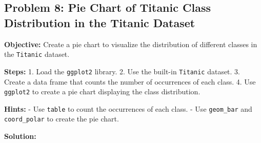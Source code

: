\documentclass[
  letterpaper,
  DIV=11,
  numbers=noendperiod]{scrreprt}
\newenvironment{Shaded}{\begin{snugshade}}{\end{snugshade}}
\newcommand{\AttributeTok}[1]{\textcolor[rgb]{0.40,0.45,0.13}{#1}}
\newcommand{\CommentTok}[1]{\textcolor[rgb]{0.37,0.37,0.37}{#1}}
\newcommand{\DecValTok}[1]{\textcolor[rgb]{0.68,0.00,0.00}{#1}}
\newcommand{\FunctionTok}[1]{\textcolor[rgb]{0.28,0.35,0.67}{#1}}
\newcommand{\NormalTok}[1]{\textcolor[rgb]{0.00,0.23,0.31}{#1}}
\newcommand{\OtherTok}[1]{\textcolor[rgb]{0.00,0.23,0.31}{#1}}
\newcommand{\SpecialCharTok}[1]{\textcolor[rgb]{0.37,0.37,0.37}{#1}}
\newcommand{\StringTok}[1]{\textcolor[rgb]{0.13,0.47,0.30}{#1}}
\begin{document}
\subsection*{Problem 8: Pie Chart of Titanic Class Distribution in the
Titanic
Dataset}\label{problem-8-pie-chart-of-titanic-class-distribution-in-the-titanic-dataset}

\textbf{Objective:} Create a pie chart to visualize the distribution of
different classes in the \texttt{Titanic} dataset.

\textbf{Steps:} 1. Load the \texttt{ggplot2} library. 2. Use the
built-in \texttt{Titanic} dataset. 3. Create a data frame that counts
the number of occurrences of each class. 4. Use \texttt{ggplot2} to
create a pie chart displaying the class distribution.

\textbf{Hints:} - Use \texttt{table} to count the occurrences of each
class. - Use \texttt{geom\_bar} and \texttt{coord\_polar} to create the
pie chart.

\textbf{Solution:}

\begin{Shaded}
\end{Shaded}
\end{document}
